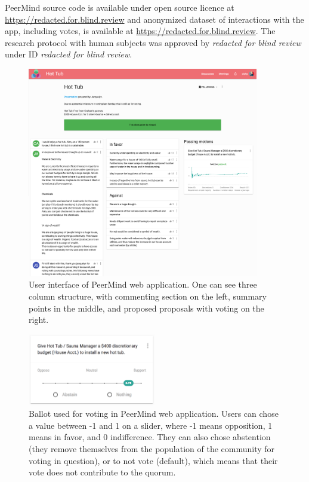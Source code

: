 \documentclass[format=acmsmall, review=true, screen=true, anonymous=true]{acmart}
\begin{document}
PeerMind source code is available under open source licence at \url{https://redacted.for.blind.review} and
anonymized dataset of interactions with the app, including votes, is available at \url{https://redacted.for.blind.review}.
The research protocol with human subjects was approved by \emph{redacted for blind review} under
ID \emph{redacted for blind review}.

\begin{figure}[ht]
\centering
\includegraphics[width=0.9\textwidth]{figures/peermind.png}
\caption{User interface of PeerMind web application. One can see three column structure, with commenting
section on the left, summary points in the middle, and proposed proposals with voting on the right.}
\label{fig:peer-mind}
\end{figure}

\begin{figure}[ht]
\centering
\includegraphics[width=0.5\textwidth]{figures/ballot.png}
\caption{Ballot used for voting in PeerMind web application. Users can chose a value between -1 and 1 on a slider,
where -1 means opposition, 1 means in favor, and 0 indifference. They can also chose abstention (they
remove themselves from the population of the community for voting in question), or to not vote (default), which
means that their vote does not contribute to the quorum.}
\label{fig:ballot}
\end{figure}
\end{document}
